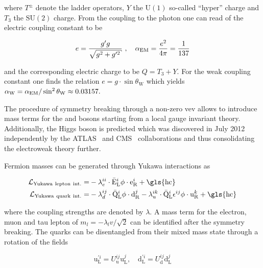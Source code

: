 where $T^{\pm}$ denote the ladder operators, $Y$ the $\mathrm{U(1)}$ so-called ``hyper'' charge and $T_3$ the $\mathrm{SU(2)}$  charge. From the coupling to the photon one can read of the electric coupling constant to be 

\begin{equation}
e=\frac{g^{\prime} g}{\sqrt{g^2+g^{\prime 2}}}~,\quad \aem=\frac{e^2}{4\pi}=\frac{1}{137}
\end{equation}

and the corresponding electric charge to be $Q=T_3+Y$. For the weak coupling constant one finds the relation $e=g\cdot\sin\theta_\mathrm{W}$ which yields ${\alpha_\mathrm{W}}={\alpha_\mathrm{EM}}/\sin^2\theta_\mathrm{W}\approx0.03157.$

The procedure of symmetry breaking through a non-zero \gls{vev} allows to introduce mass terms for the \wboson and \zboson bosons starting from a local gauge invariant theory. Additionally, the Higgs boson is predicted which was discovered in July 2012 independently by the ATLAS~\cite{Aad:2012tfa} and CMS~\cite{Chatrchyan:2012xdj} collaborations and thus consolidating the electroweak theory further.


Fermion masses can be generated through Yukawa interactions as

\begin{align}
\mathcal{L}_\mathrm{Yukawa~lepton~int.}=&-\lambda_{e}^{ii}\cdot\bar{\mathrm{E}}^{i}_\mathrm{L}\phi\cdot\mathrm{e}^{i}_\mathrm{R}+\mathrm{\gls{hc}} \label{eq:theory-lepton-yukawa}\\
\mathcal{L}_\mathrm{Yukawa~quark~int.}=&-\lambda_{d}^{ij}\cdot\bar{\mathrm{Q}}^{i}_\mathrm{L}\phi\cdot\mathrm{d}^{j}_\mathrm{R}-\lambda_{u}^{ik}\cdot\bar{\mathrm{Q}}^{i}_\mathrm{L}\epsilon^{ij}\phi\cdot\mathrm{u}^{k}_\mathrm{R} +\mathrm{\gls{hc}} \label{eq:theory-quark-yukawa}
\end{align}

where the coupling strengths are denoted by $\lambda$. A mass term for the electron, muon and tau lepton of $m_l=-\lambda_l v/\sqrt{2}$ can be identified after the symmetry breaking. The quarks can be disentangled from their mixed mass state through a rotation of the fields 

\begin{equation}
\mathrm{u}^{\prime i}_\mathrm{L}=U^{ij}_\mathrm{u}\mathrm{u}^{j}_\mathrm{L},\quad \mathrm{d}^{\prime i}_\mathrm{L}=U^{ij}_\mathrm{d}\mathrm{d}^{j}_\mathrm{L}
\end{equation}


